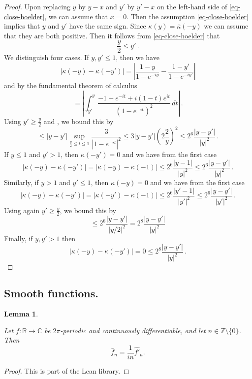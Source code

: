 \documentclass[10pt,a4paper]{article}
\theoremstyle{plain}
\newtheorem{lemma}[theorem]{Lemma}
\theoremstyle{definition}
\numberwithin{equation}{subsection}
\newcommand{\Z}{{\mathbb{Z}}}
\newcommand{\R}{{\mathbb{R}}}
\newcommand{\lean}[1]{}
\newcommand{\leanok}{}
\def\C{\mathbb{C}}
\begin{document}
\begin{proof}
\leanok
    Upon replacing $y$ by $y-x$ and $y'$ by $y'-x$ on the left-hand side of \eqref{eq-close-hoelder}, we can assume that $x = 0$. Then the assumption \eqref{eq-close-hoelder} implies that $y$ and $y'$ have the same sign. Since $\kappa(y) = \bar \kappa(-y)$ we can assume that they are both positive. Then it follows from \eqref{eq-close-hoelder} that
    $$
        \frac{y}{2} \le y' \,.
    $$
    We distinguish four cases. If $y, y' \le 1$, then we have
    $$
        |\kappa(-y) - \kappa(-y')| = \left| \frac{1 - y}{1- e^{-iy}} - \frac{1 - y'}{1- e^{-iy'}}\right|
    $$
    and by the fundamental theorem of calculus
    $$
        = \left| \int_{y'}^{y} \frac{-1 + e^{-it} + i(1-t)e^{it}}{(1 - e^{-it})^2} \,dt \right|\,.
    $$
    Using $y' \ge \frac{y}{2}$ and , we bound this by
    $$
        \le |y - y'| \sup_{\frac{y}{2} \le t \le 1} \frac{3}{|1 - e^{-it}|^2} \le 3 |y-y'| (2 \frac{2}{y})^2 \le 2^{6} \frac{|y-y'|}{|y|^2}\,.
    $$
    If $y \le 1$ and $y' > 1$, then $\kappa(-y') = 0$ and we have from the first case
    $$
        |\kappa(-y) - \kappa(-y')| = |\kappa(-y) - \kappa(-1)| \le 2^{6} \frac{|y-1|}{|y|^2} \le 2^{6} \frac{|y-y'|}{|y|^2}\,.
    $$
    Similarly, if $y > 1$ and $y' \le 1$, then $\kappa(-y) = 0$ and we have from the first case
    $$
        |\kappa(-y) - \kappa(-y')| = |\kappa(-y') - \kappa(-1)| \le 2^{6} \frac{|y'-1|}{|y'|^2} \le 2^{6} \frac{|y-y'|}{|y'|^2}\,.
    $$
    Using again $y' \ge \frac{y}{2}$, we bound this by
    $$
        \le 2^{6} \frac{|y-y'|}{|y / 2|^2} = 2^{8} \frac{|y-y'|}{|y|^2}
    $$
    Finally, if $y, y' > 1$ then
    $$
        |\kappa(-y) - \kappa(-y')| = 0 \le 2^{8} \frac{|y-y'|}{|y|^2}\,.
    $$
\end{proof}






\subsection{Smooth functions.}
\label{10smooth}
\begin{lemma}
\label{fourier-coeff-derivative}
\leanok
\lean{fourierCoeffOn_of_hasDerivAt}
Let $f:\R \to \C$ be $2\pi$-periodic and continuously differentiable, and let $n \in \Z \setminus \{0\}$. Then
\begin{equation}
    \widehat{f}_n = \frac{1}{i n} \widehat{f'}_n.
\end{equation}
\end{lemma}
\begin{proof}
\leanok
This is part of the Lean library.
\end{proof}
\end{document}
